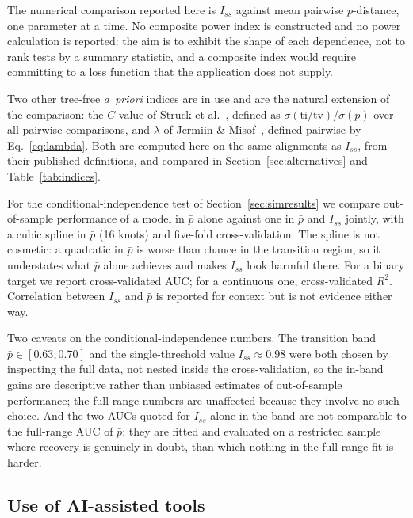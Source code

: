 \documentclass[11pt]{article}
\newcommand{\Iss}{I_{ss}}
\theoremstyle{definition}
\theoremstyle{remark}
\begin{document}
The numerical comparison reported here is $\Iss$ against mean pairwise
$p$-distance, one parameter at a time. No composite power index is
constructed and no power calculation is reported: the aim is to exhibit the
shape of each dependence, not to rank tests by a summary statistic, and a
composite index would require committing to a loss function that the
application does not supply.

Two other tree-free \emph{a~priori} indices are in use and are the natural
extension of the comparison: the $C$ value of
Struck et al.~\citep{struck2008cfactor}, defined as
$\sigma(\mathrm{ti/tv})/\sigma(p)$ over all pairwise comparisons, and
$\lambda$ of Jermiin \& Misof~\citep{jermiin2020signal}, defined pairwise by
Eq.~\eqref{eq:lambda}. Both are computed here on the same alignments as
$\Iss$, from their published definitions, and compared in
Section~\ref{sec:alternatives} and Table~\ref{tab:indices}.

For the conditional-independence test of Section~\ref{sec:simresults} we
compare out-of-sample performance of a model in $\bar p$ alone against one in
$\bar p$ and $\Iss$ jointly, with a cubic spline in $\bar p$ (16 knots) and
five-fold cross-validation. The spline is not cosmetic: a quadratic in
$\bar p$ is worse than chance in the transition region, so it understates what
$\bar p$ alone achieves and makes $\Iss$ look harmful there. For a binary
target we report cross-validated AUC; for a continuous one, cross-validated
$R^2$. Correlation between $\Iss$ and $\bar p$ is reported for context but is
not evidence either way.

Two caveats on the conditional-independence numbers. The transition band
$\bar p\in[0.63,0.70]$ and the single-threshold value $\Iss\approx0.98$ were
both chosen by inspecting the full data, not nested inside the
cross-validation, so the in-band gains are descriptive rather than unbiased
estimates of out-of-sample performance; the full-range numbers are unaffected
because they involve no such choice. And the two AUCs quoted for $\Iss$ alone
in the band are not comparable to the full-range AUC of $\bar p$: they are
fitted and evaluated on a restricted sample where recovery is genuinely in
doubt, than which nothing in the full-range fit is harder.

\subsection*{Use of AI-assisted tools}
\end{document}
